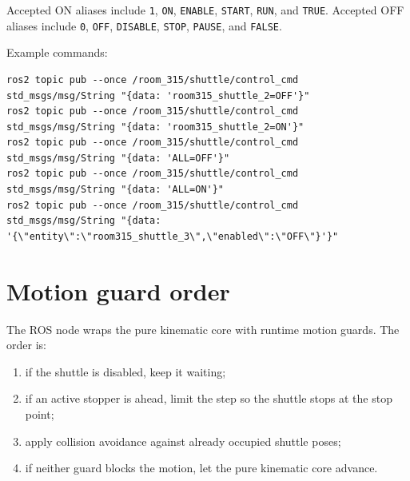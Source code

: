 \documentclass[12pt,a4paper]{report}
\newcommand{\codenext}[1]{\par\Needspace{#1\baselineskip}}
\begin{document}
\codenext{40}


Accepted ON aliases include \texttt{1}, \texttt{ON}, \texttt{ENABLE},
\texttt{START}, \texttt{RUN}, and \texttt{TRUE}. Accepted OFF aliases include
\texttt{0}, \texttt{OFF}, \texttt{DISABLE}, \texttt{STOP}, \texttt{PAUSE}, and
\texttt{FALSE}.

Example commands:

\begin{lstlisting}[style=terminalcode]
ros2 topic pub --once /room_315/shuttle/control_cmd std_msgs/msg/String "{data: 'room315_shuttle_2=OFF'}"
ros2 topic pub --once /room_315/shuttle/control_cmd std_msgs/msg/String "{data: 'room315_shuttle_2=ON'}"
ros2 topic pub --once /room_315/shuttle/control_cmd std_msgs/msg/String "{data: 'ALL=OFF'}"
ros2 topic pub --once /room_315/shuttle/control_cmd std_msgs/msg/String "{data: 'ALL=ON'}"
ros2 topic pub --once /room_315/shuttle/control_cmd std_msgs/msg/String "{data: '{\"entity\":\"room315_shuttle_3\",\"enabled\":\"OFF\"}'}"
\end{lstlisting}

\section{Motion guard order}

The ROS node wraps the pure kinematic core with runtime motion guards. The
order is:

\begin{enumerate}
\item if the shuttle is disabled, keep it waiting;
\item if an active stopper is ahead, limit the step so the shuttle stops at the
stop point;
\item apply collision avoidance against already occupied shuttle poses;
\item if neither guard blocks the motion, let the pure kinematic core advance.
\end{enumerate}

\codenext{36}

\end{document}
